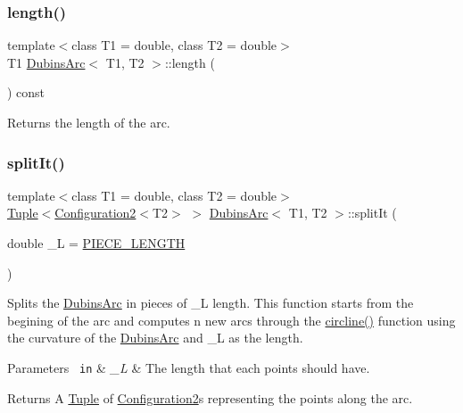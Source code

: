 \subsubsection{\texorpdfstring{length()}{length()}}
{\footnotesize\ttfamily template$<$class T1 = double, class T2 = double$>$ \\
T1 \mbox{\hyperlink{class_dubins_arc}{Dubins\+Arc}}$<$ T1, T2 $>$\+::length (\begin{DoxyParamCaption}{ }\end{DoxyParamCaption}) const\hspace{0.3cm}{\ttfamily [inline]}}



Returns the length of the arc. 

\mbox{\label{class_dubins_arc_af7c6ad3f4c81b2b75c9f439afd9fa746}} 
\subsubsection{\texorpdfstring{splitIt()}{splitIt()}}
{\footnotesize\ttfamily template$<$class T1 = double, class T2 = double$>$ \\
\mbox{\hyperlink{class_tuple}{Tuple}}$<$\mbox{\hyperlink{class_configuration2}{Configuration2}}$<$T2$>$ $>$ \mbox{\hyperlink{class_dubins_arc}{Dubins\+Arc}}$<$ T1, T2 $>$\+::split\+It (\begin{DoxyParamCaption}\item[{double}]{\+\_\+L = {\ttfamily \mbox{\hyperlink{dubins_8hh_a5b2500ca93a5100f73dc442d3cfea7d4}{P\+I\+E\+C\+E\+\_\+\+L\+E\+N\+G\+TH}}} }\end{DoxyParamCaption})\hspace{0.3cm}{\ttfamily [inline]}}



Splits the {\ttfamily \mbox{\hyperlink{class_dubins_arc}{Dubins\+Arc}}} in pieces of \+\_\+L length. This function starts from the begining of the arc and computes n new arcs through the {\ttfamily \mbox{\hyperlink{dubins_8cc_adef8b363044d7fed558e5b47d8d6a3a0}{circline()}}} function using the curvature of the {\ttfamily \mbox{\hyperlink{class_dubins_arc}{Dubins\+Arc}}} and \+\_\+L as the length. 


\begin{DoxyParams}[1]{Parameters}
\mbox{\texttt{ in}}  & {\em \+\_\+L} & The length that each points should have. \\
\hline
\end{DoxyParams}
\begin{DoxyReturn}{Returns}
A {\ttfamily \mbox{\hyperlink{class_tuple}{Tuple}}} of {\ttfamily \mbox{\hyperlink{class_configuration2}{Configuration2}}}s representing the points along the arc. 
\end{DoxyReturn}
\mbox{\label{class_dubins_arc_aa90c32f88f048e4e17ea79489f44dbfb}} 
